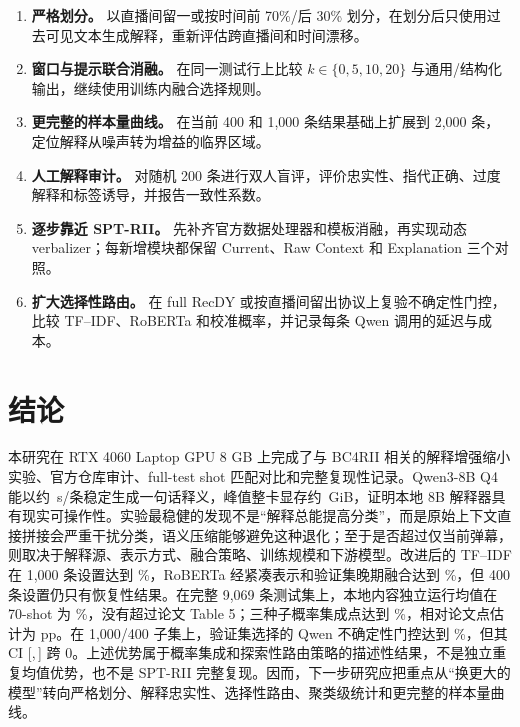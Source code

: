 \documentclass[UTF8,zihao=-4,a4paper]{ctexart}
\begin{document}
\begin{enumerate}[leftmargin=2em]
  \item \textbf{严格划分。} 以直播间留一或按时间前 70\%/后 30\% 划分，在划分后只使用过去可见文本生成解释，重新评估跨直播间和时间漂移。
  \item \textbf{窗口与提示联合消融。} 在同一测试行上比较 $k\in\{0,5,10,20\}$ 与通用/结构化输出，继续使用训练内融合选择规则。
  \item \textbf{更完整的样本量曲线。} 在当前 400 和 1,000 条结果基础上扩展到 2,000 条，定位解释从噪声转为增益的临界区域。
  \item \textbf{人工解释审计。} 对随机 200 条进行双人盲评，评价忠实性、指代正确、过度解释和标签诱导，并报告一致性系数。
  \item \textbf{逐步靠近 SPT-RII。} 先补齐官方数据处理器和模板消融，再实现动态 verbalizer；每新增模块都保留 Current、Raw Context 和 Explanation 三个对照。
  \item \textbf{扩大选择性路由。} 在 full RecDY 或按直播间留出协议上复验不确定性门控，比较 TF--IDF、RoBERTa 和校准概率，并记录每条 Qwen 调用的延迟与成本。
\end{enumerate}

\section{结论}

本研究在 RTX 4060 Laptop GPU 8 GB 上完成了与 BC4RII 相关的解释增强缩小实验、官方仓库审计、full-test shot 匹配对比和完整复现性记录。Qwen3-8B Q4 能以约 \QwenGenerationMeanSeconds\,s/条稳定生成一句话释义，峰值整卡显存约 \QwenGenerationPeakGiB\,GiB，证明本地 8B 解释器具有现实可操作性。实验最稳健的发现不是“解释总能提高分类”，而是原始上下文直接拼接会严重干扰分类，语义压缩能够避免这种退化；至于是否超过仅当前弹幕，则取决于解释源、表示方式、融合策略、训练规模和下游模型。改进后的 TF--IDF 在 1,000 条设置达到 \ImproveTFIDFLargeStructuredLate\%，RoBERTa 经紧凑表示和验证集晚期融合达到 \ImproveRobertaLargeLateFusion\%，但 400 条设置仍只有恢复性结果。在完整 9,069 条测试集上，本地内容独立运行均值在 70-shot 为 \PaperMatchedContentMeanSeventy\%，没有超过论文 Table 5；三种子概率集成点达到 \PaperMatchedContentEnsembleSeventy\%，相对论文点估计为 \PaperMatchedContentEnsembleDeltaSeventy pp。在 1,000/400 子集上，验证集选择的 Qwen 不确定性门控达到 \GateMacroF\%，但其 CI [\GateCILowPP,\,\GateCIHighPP] 跨 0。上述优势属于概率集成和探索性路由策略的描述性结果，不是独立重复均值优势，也不是 SPT-RII 完整复现。因而，下一步研究应把重点从“换更大的模型”转向严格划分、解释忠实性、选择性路由、聚类级统计和更完整的样本量曲线。
\end{document}
